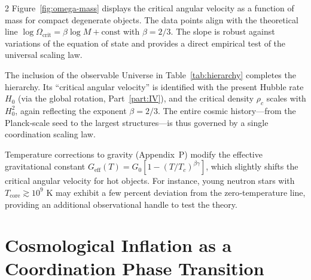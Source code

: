 \documentclass[12pt,a4paper]{article}
\begin{document}
	\begin{multicols}{2}
		Figure~\ref{fig:omega-mass} displays the critical angular velocity as a function of mass for compact degenerate objects. The data points align with the theoretical line \(\log\Omega_{\mathrm{crit}} = \beta \log M + \mathrm{const}\) with \(\beta = 2/3\). The slope is robust against variations of the equation of state and provides a direct empirical test of the universal scaling law.
		
		The inclusion of the observable Universe in Table~\ref{tab:hierarchy} completes the hierarchy. Its ``critical angular velocity'' is identified with the present Hubble rate \(H_0\) (via the global rotation, Part~\ref{part:IV}), and the critical density \(\rho_c\) scales with \(H_0^2\), again reflecting the exponent \(\beta=2/3\). The entire cosmic history—from the Planck‑scale seed to the largest structures—is thus governed by a single coordination scaling law.
		
		Temperature corrections to gravity (Appendix~P) modify the effective gravitational constant \(G_{\mathrm{eff}}(T) = G_0[1 - (T/T_c)^{\beta\gamma}]\), which slightly shifts the critical angular velocity for hot objects. For instance, young neutron stars with \(T_{\mathrm{core}} \gtrsim 10^9\) K may exhibit a few percent deviation from the zero‑temperature line, providing an additional observational handle to test the theory.
		
	\end{multicols}
	
	\part{Cosmological Inflation as a Coordination Phase Transition}
	\label{part:III}
	
\end{document}
